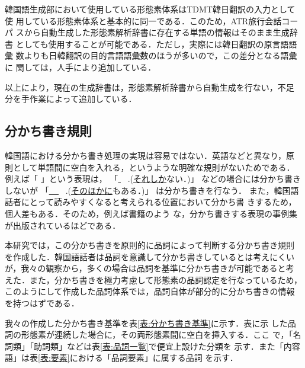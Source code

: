 韓国語生成部において使用している形態素体系はTDMT韓日翻訳の入力として使
用している形態素体系と基本的に同一である．このため，ATR旅行会話コーパ
スから自動生成した形態素解析辞書に存在する単語の情報はそのまま生成辞書
としても使用することが可能である．ただし，実際には韓日翻訳の原言語語彙
数よりも日韓翻訳の目的言語語彙数のほうが多いので，この差分となる語彙に
関しては，人手により追加している．

以上により，現在の生成辞書は，形態素解析辞書から自動生成を行ない，不足
分を手作業によって追加している．



\subsection{分かち書き規則}

韓国語における分かち書き処理の実現は容易ではない．英語などと異なり，原
則として単語間に空白を入れる，というような明確な規則がないためである．
例えば「
」という表現は，
「\underline{
}\ 
.(\underline{それしか}ない．)」
などの場合には分かち書きしないが
「\underline{
\ 
}
\ 
.(\underline{そのほかに}もある．)」
は分かち書きを行なう\cite{分かち書き}．
また，韓国語話者にとって読みやすくなると考えられる位置において分かち書
きするため，個人差もある．そのため，例えば書籍\cite{分かち書き}のよう
な，分かち書きする表現の事例集が出版されているほどである．

本研究では，この分かち書きを原則的に品詞によって判断する分かち書き規則
を作成した．韓国語話者は品詞を意識して分かち書きしているとは考えにくい
が，我々の観察から，多くの場合は品詞を基準に分かち書きが可能であると考
えた．また，分かち書きを極力考慮して形態素の品詞認定を行なっているため，
このようにして作成した品詞体系では，品詞自体が部分的に分かち書きの情報
を持つはずである．

我々の作成した分かち書き基準を表\ref{表:分かち書き基準}に示す．表に示
した品詞の形態素が連続した場合に，その両形態素間に空白を挿入する．ここ
で，「名詞類」「助詞類」などは表\ref{表:品詞一覧}で便宜上設けた分類を
示す．また「内容語」は表\ref{表:要素}における「品詞要素」に属する品詞
を示す．


